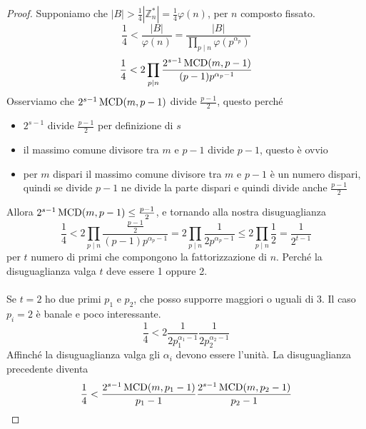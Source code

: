 \begin{proof}
	Supponiamo che $\left|B\right|>\frac{1}{4}\left|\mathbb{Z}_n^*\right|=\frac{1}{4}\varphi(n)$, per $n$ composto fissato. 
	\begin{equation*}
	\frac{1}{4}<\frac{\left|B\right|}{\varphi(n)}=\frac{\left|B\right|}{\prod_{p\mid n}\varphi\left(p^{\alpha_p}\right)}
	\end{equation*}
	\begin{equation*}
	\frac{1}{4}<2\prod_{p\mid n}\frac{2^{s-1}\operatorname{\mathrm{MCD}}(m,p-1)}{(p-1)p^{\alpha_p-1}}
	\end{equation*}
	Osserviamo che $2^{s-1}\operatorname{\mathrm{MCD}}(m,p-1)$ divide $\frac{p-1}{2}$, questo perché 
	\begin{itemize}
		\item $2^{s-1}$ divide $\frac{p-1}{2}$ per definizione di $s$
		\item il massimo comune divisore tra $m$ e $p-1$ divide $p-1$, questo è ovvio
		\item per $m$ dispari il massimo comune divisore tra $m$ e $p-1$ è un numero dispari, quindi se divide $p-1$ ne divide la parte dispari e quindi divide anche $\frac{p-1}{2}$
	\end{itemize}
	Allora $2^{s-1}\operatorname{\mathrm{MCD}}(m,p-1)\leq\frac{p-1}{2}$, e tornando alla nostra disuguaglianza
	\begin{equation*}
	\frac{1}{4}<2\prod_{p\mid n}\frac{\frac{p-1}{2}}{(p-1)p^{\alpha_p-1}}
	=2\prod_{p\mid n}\frac{1}{2p^{\alpha_p-1}}\leq2\prod_{p\mid n}\frac{1}{2}=\frac{1}{2^{t-1}}
	\end{equation*}
	per $t$ numero di primi che compongono la fattorizzazione di $n$. Perché la disuguaglianza valga $t$ deve essere 1 oppure 2. \\ \\ Se $t=2$ ho due primi $p_1$ e $p_2$, che posso supporre maggiori o uguali di 3. Il caso $p_i=2$ è banale e poco interessante.
	\begin{equation*}
	\frac{1}{4}<2\frac{1}{2p_1^{\alpha_1-1}}\frac{1}{2p_2^{\alpha_2-1}}
	\end{equation*}
	Affinché la disuguaglianza valga gli $\alpha_i$ devono essere l'unità. La disuguaglianza precedente diventa
	\begin{equation*}
	\frac{1}{4}<\frac{2^{s-1}\operatorname{\mathrm{MCD}}(m,p_1-1)}{p_1-1}\frac{2^{s-1}\operatorname{\mathrm{MCD}}(m,p_2-1)}{p_2-1}
	\end{equation*}
	\begin{equation*}

\end{equation*}
\end{proof}
